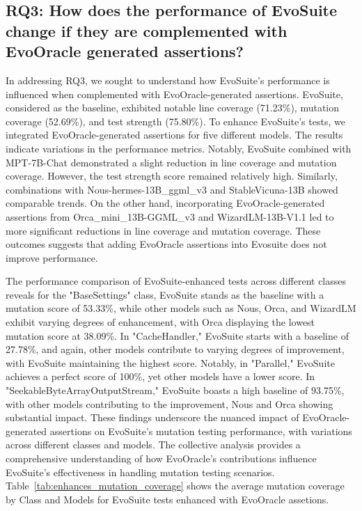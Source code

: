 \vspace{0.1 cm}
\subsection{RQ3: How does the performance of EvoSuite change if they are complemented with EvoOracle generated assertions?}
\label{sec:results_rq3}
\vspace{0.1 cm}

In addressing RQ3, we sought to understand how EvoSuite's performance is influenced when complemented with EvoOracle-generated assertions. EvoSuite, considered as the baseline, exhibited notable line coverage (71.23\%), mutation coverage (52.69\%), and test strength (75.80\%). To enhance EvoSuite's tests, we integrated EvoOracle-generated assertions for five different models. The results indicate variations in the performance metrics. Notably, EvoSuite combined with MPT-7B-Chat demonstrated a slight reduction in line coverage and mutation coverage. However, the test strength score remained relatively high. Similarly, combinations with Nous-hermes-13B\_ggml\_v3 and StableVicuna-13B showed comparable trends. On the other hand, incorporating EvoOracle-generated assertions from Orca\_mini\_13B-GGML\_v3 and WizardLM-13B-V1.1 led to more significant reductions in line coverage and mutation coverage. These outcomes suggests that adding EvoOracle assertions into Evosuite does not improve performance.

The performance comparison of EvoSuite-enhanced tests across different classes reveals for the "BaseSettings" class, EvoSuite stands as the baseline with a mutation score of 53.33\%, while other models such as Nous, Orca, and WizardLM exhibit varying degrees of enhancement, with Orca displaying the lowest mutation score at 38.09\%. In "CacheHandler," EvoSuite starts with a baseline of 27.78\%, and again, other models contribute to varying degrees of improvement, with EvoSuite maintaining the highest score. Notably, in "Parallel," EvoSuite achieves a perfect score of 100\%, yet other models have a lower score. In "SeekableByteArrayOutputStream," EvoSuite boasts a high baseline of 93.75\%, with other models contributing to the improvement, Nous and Orca showing substantial impact. These findings underscore the nuanced impact of EvoOracle-generated assertions on EvoSuite's mutation testing performance, with variations across different classes and models. The collective analysis provides a comprehensive understanding of how EvoOracle's contributions influence EvoSuite's effectiveness in handling mutation testing scenarios. Table~\ref{tab:enhances_mutation_coverage} shows the average mutation coverage by Class and Models for EvoSuite tests enhanced with EvoOracle assetions.

